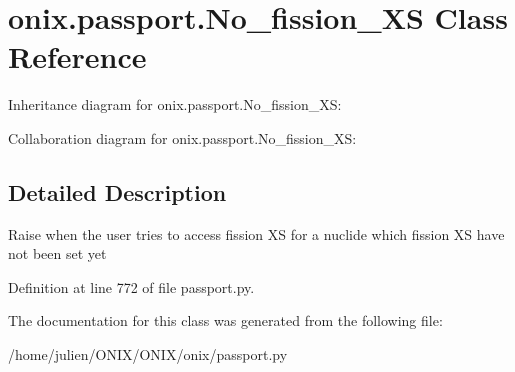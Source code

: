 \hypertarget{classonix_1_1passport_1_1No__fission__XS}{}\section{onix.\+passport.\+No\+\_\+fission\+\_\+\+XS Class Reference}
\label{classonix_1_1passport_1_1No__fission__XS}


Inheritance diagram for onix.\+passport.\+No\+\_\+fission\+\_\+\+XS\+:


Collaboration diagram for onix.\+passport.\+No\+\_\+fission\+\_\+\+XS\+:


\subsection{Detailed Description}
\begin{DoxyVerb}Raise when the user tries to access fission XS for a nuclide which fission XS have not been set yet \end{DoxyVerb}
 

Definition at line 772 of file passport.\+py.



The documentation for this class was generated from the following file\+:\begin{DoxyCompactItemize}
\item 
/home/julien/\+O\+N\+I\+X/\+O\+N\+I\+X/onix/passport.\+py\end{DoxyCompactItemize}
